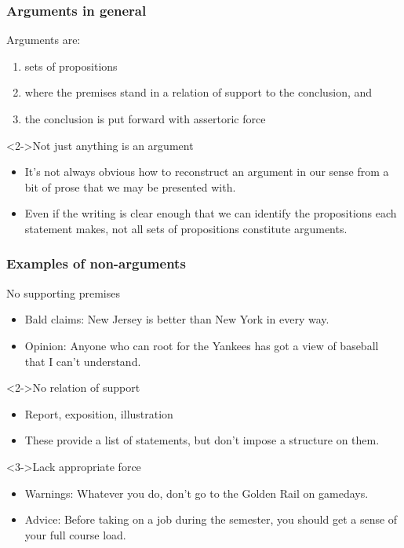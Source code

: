 \documentclass[10pt,letterpaper,xcolor=dvipsnames,handout]{beamer}
\begin{document}
\begin{frame}
\frametitle{Arguments in general}

\begin{block}{Arguments are:}
\begin{enumerate}
  \item sets of propositions 
  \item where the premises stand in a relation of support to the conclusion, and
  \item the conclusion is put forward with assertoric force
\end{enumerate}  
\end{block}

\begin{block}<2->{Not just anything is an argument}
\begin{itemize}
  \item It's not always obvious how to reconstruct an argument in our sense from a bit of prose that we may be presented with.
  \item Even if the writing is clear enough that we can identify the propositions each statement makes, not all sets of propositions constitute arguments.
\end{itemize}
\end{block}

\end{frame}

\begin{frame}
\frametitle{Examples of non-arguments}

\begin{block}{No supporting premises}
  \begin{itemize}
    \item Bald claims: New Jersey is better than New York in every way.
    \item Opinion: Anyone who can root for the Yankees has got a view of baseball that I can't understand.
  \end{itemize}
\end{block}

\begin{block}<2->{No relation of support}
\begin{itemize}
   \item Report, exposition, illustration
   \item These provide a list of statements, but don't impose a structure on them.
\end{itemize}
\end{block}

\begin{block}<3->{Lack appropriate force}
  \begin{itemize}
    \item Warnings: Whatever you do, don't go to the Golden Rail on gamedays.
    \item Advice: Before taking on a job during the semester, you should get a sense of your full course load.
  \end{itemize}
\end{block}

\end{frame}
\end{document}
